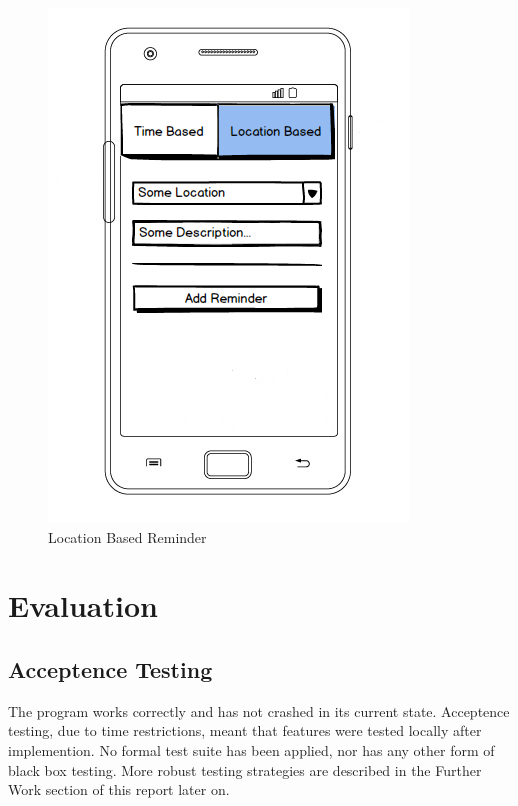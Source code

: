 \documentclass[12pt]{article} %
\begin{document}
\begin{figure}[H]
\begin{minipage}[h]{0.45\linewidth}
\includegraphics[width=\textwidth]{Reminder2}
\caption{Location Based Reminder}
\label{fig:figure2}
\end{minipage}
\end{figure}


\section{Evaluation}
\subsection{Acceptence Testing}

The program works correctly and has not crashed in its current state. Acceptence testing, due to time restrictions, meant that features were tested locally after implemention. No formal test suite has been applied, nor has any other form of black box testing. More robust testing strategies are described in the Further Work section of this report later on.
\end{document}
